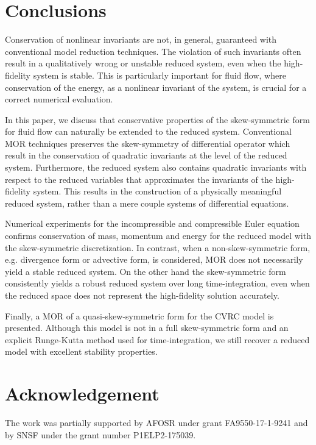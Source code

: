 \section{Conclusions} \label{sec:con}

Conservation of nonlinear invariants are not, in general, guaranteed with conventional model reduction techniques. The violation of such invariants often result in a qualitatively wrong or unstable reduced system, even when the high-fidelity system is stable. This is particularly important for fluid flow, where conservation of the energy, as a nonlinear invariant of the system, is crucial for a correct numerical evaluation.

In this paper, we discuss that conservative properties of the skew-symmetric form for fluid flow can naturally be extended to the reduced system. Conventional MOR techniques preserves the skew-symmetry of differential operator which result in the conservation of quadratic invariants at the level of the reduced system. Furthermore, the reduced system also contains quadratic invariants with respect to the reduced variables that approximates the invariants of the high-fidelity system. This results in the construction of a physically meaningful reduced system, rather than a mere couple systems of differential equations.

Numerical experiments for the incompressible and compressible Euler equation confirms conservation of mass, momentum and energy for the reduced model with the skew-symmetric discretization. In contrast, when a non-skew-symmetric form, e.g. divergence form or advective form, is considered, MOR does not necessarily yield a stable reduced system. On the other hand the skew-symmetric form consistently yields a robust reduced system over long time-integration, even when the reduced space does not represent the high-fidelity solution accurately. 

Finally, a MOR of a quasi-skew-symmetric form for the CVRC model is presented. Although this model is not in a full skew-symmetric form and an explicit Runge-Kutta method used for time-integration, we still recover a reduced model with excellent stability properties. 

\section*{Acknowledgement} The work was partially supported by AFOSR under grant FA9550-17-1-9241 and by SNSF under the grant number P1ELP2-175039.

